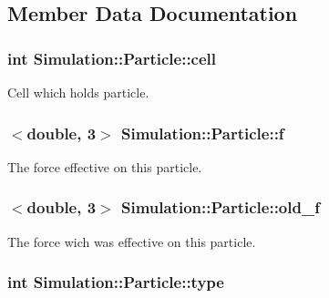 \subsection{Member Data Documentation}
\hypertarget{classSimulation_1_1Particle_aebbb649086b757029a513e09adf76d4b}{
\subsubsection[{cell}]{\setlength{\rightskip}{0pt plus 5cm}int Simulation\-::\-Particle\-::cell\hspace{0.3cm}{\ttfamily [private]}}}\label{classSimulation_1_1Particle_aebbb649086b757029a513e09adf76d4b}


Cell which holds particle. 

\hypertarget{classSimulation_1_1Particle_a54c7b7f1cb33876abdbd505d06c9b499}{
\subsubsection[{f}]{$<$double, 3$>$ Simulation\-::\-Particle\-::f\hspace{0.3cm}{\ttfamily [private]}}}\label{classSimulation_1_1Particle_a54c7b7f1cb33876abdbd505d06c9b499}


The force effective on this particle. 

\hypertarget{classSimulation_1_1Particle_a80cc4684069bff79cb7d91c25237141f}{
\subsubsection[{old\-\_\-f}]{$<$double, 3$>$ Simulation\-::\-Particle\-::old\-\_\-f\hspace{0.3cm}{\ttfamily [private]}}}\label{classSimulation_1_1Particle_a80cc4684069bff79cb7d91c25237141f}


The force wich was effective on this particle. 

\hypertarget{classSimulation_1_1Particle_aeb6388e2a21c03c7e1582eb4eeb5efb3}{
\subsubsection[{type}]{\setlength{\rightskip}{0pt plus 5cm}int Simulation\-::\-Particle\-::type\hspace{0.3cm}{\ttfamily [private]}}}\label{classSimulation_1_1Particle_aeb6388e2a21c03c7e1582eb4eeb5efb3}


